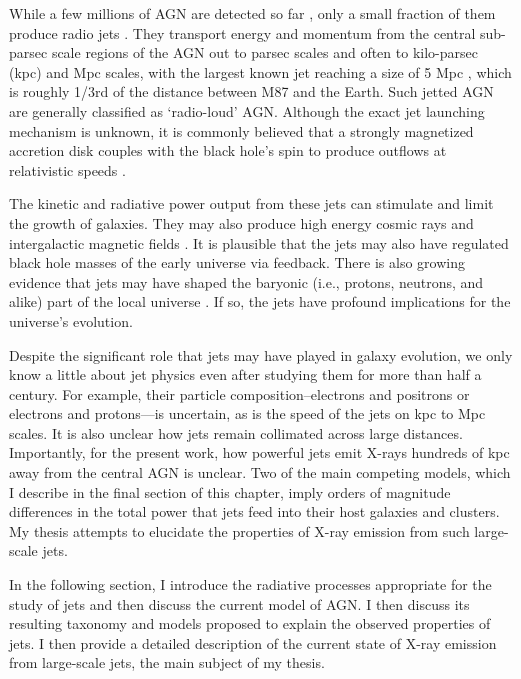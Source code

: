 While a few millions of AGN are detected so far \citep[e.g.,][]{Assef_2018}, only a small fraction of them produce radio jets \citep[e.g.,][]{ivezic2002optical,Padovani_2017}. They transport energy and momentum from the central sub-parsec scale regions of the AGN out to parsec scales and often to kilo-parsec (kpc) and Mpc scales, with the largest known jet reaching a size of 5 Mpc \citep{2022arXiv220205427O}, which is roughly 1/3rd of the distance between M87 and the Earth. Such jetted AGN are generally classified as `radio-loud' AGN. Although the exact jet launching mechanism is unknown, it is commonly believed that a strongly magnetized accretion disk couples with the black hole's spin to produce outflows at relativistic speeds \citep[][]{blandford2019relativistic}.

The kinetic and radiative power output from these jets can stimulate and limit the growth of galaxies. They may also produce high energy cosmic rays and intergalactic magnetic fields \citep[for a recent review, see][]{blandford2019relativistic}. It is plausible that the jets may also have regulated black hole masses of the early universe \citep{churazov2005supermassive} via feedback. There is also growing evidence that jets may have shaped the baryonic (i.e., protons, neutrons, and alike) part of the local universe  \citep[][]{fabian2012observational}. If so, the jets have profound implications for the universe's evolution.

Despite the significant role that jets may have played in galaxy evolution, we only know a little about jet physics even after studying them for more than half a century. For example, 
their particle composition--electrons and positrons or electrons and protons---is uncertain, as is the speed of the jets on kpc to Mpc scales. It is also unclear how jets remain collimated across large distances. Importantly, for the present work,  how powerful jets emit X-rays hundreds of kpc away from the central AGN is unclear. Two of the main competing models, which I describe in the final section of this chapter, imply orders of magnitude differences in the total power that jets feed into their host galaxies and clusters. My thesis attempts to elucidate the properties of X-ray emission from such large-scale jets.

In the following section, I introduce the radiative processes appropriate for the study of jets and then discuss the current model of AGN. I then discuss its resulting taxonomy and models proposed to explain the observed properties of jets. I then provide a detailed description of the current state of X-ray emission from large-scale jets, the main subject of my thesis.

